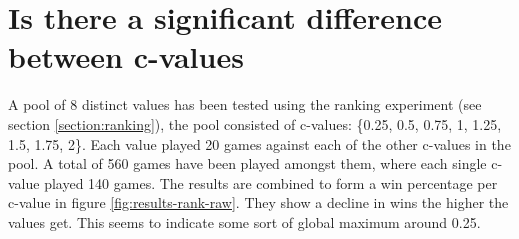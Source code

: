 \documentclass[
11pt, %
english, %
singlespacing, %
headsepline, %
]{MastersDoctoralThesis} %
\begin{document}
\section{Is there a significant difference between c-values}
\label{section:raw-ranking}
A pool of 8 distinct values has been tested using the ranking experiment (see section \ref{section:ranking}), the pool consisted of c-values: \{0.25, 0.5, 0.75, 1, 1.25, 1.5, 1.75, 2\}. Each value played 20 games against each of the other c-values in the pool. A total of 560 games have been played amongst them, where each single c-value played 140 games. The results are combined to form a win percentage per c-value in figure \ref{fig:results-rank-raw}. They show a decline in wins the higher the values get. This seems to indicate some sort of global maximum around 0.25.
\end{document}

